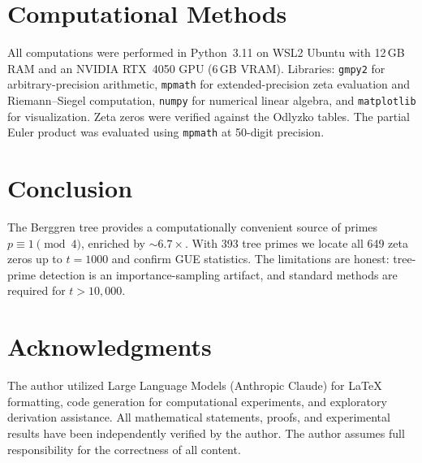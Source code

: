 \documentclass[12pt]{amsart}
\theoremstyle{definition}
\theoremstyle{remark}
\begin{document}

\section{Computational Methods}\label{sec:computational}

All computations were performed in Python~3.11 on WSL2 Ubuntu with 12\,GB
RAM and an NVIDIA RTX~4050 GPU (6\,GB VRAM). Libraries: \texttt{gmpy2} for
arbitrary-precision arithmetic, \texttt{mpmath} for extended-precision zeta
evaluation and Riemann--Siegel computation, \texttt{numpy} for numerical
linear algebra, and \texttt{matplotlib} for visualization. Zeta zeros were
verified against the Odlyzko tables. The partial Euler product was evaluated
using \texttt{mpmath} at 50-digit precision.


\section{Conclusion}\label{sec:conclusion}

The Berggren tree provides a computationally convenient source of primes
$p \equiv 1 \pmod{4}$, enriched by $\sim 6.7\times$. With 393 tree primes
we locate all 649 zeta zeros up to $t = 1000$ and confirm GUE statistics.
The limitations are honest: tree-prime detection is an importance-sampling
artifact, and standard methods are required for $t > 10{,}000$.


\section*{Acknowledgments}
The author utilized Large Language Models (Anthropic Claude) for \LaTeX{}
formatting, code generation for computational experiments, and exploratory
derivation assistance. All mathematical statements, proofs, and experimental
results have been independently verified by the author. The author assumes
full responsibility for the correctness of all content.
\end{document}
